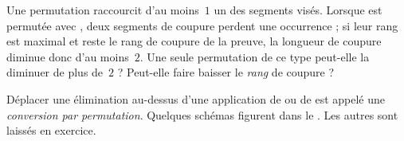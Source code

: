 \documentclass[../../../include/open-logic-section]{subfiles}
\begin{document}
\begin{prob}
Une permutation raccourcit d'au moins~$1$
un des segments visés. Lorsque \Elim{\land}
est permutée avec \Elim{\lor}, deux segments
de coupure perdent une occurrence ; si leur
rang est maximal et reste le rang de coupure
de la preuve, la longueur de coupure diminue
donc d'au moins~$2$. Une seule permutation
de ce type peut-elle la diminuer de plus
de~$2$ ? Peut-elle faire baisser le
\emph{rang} de coupure ?
\end{prob}

Déplacer une élimination au-dessus d'une
application de \Elim{\lor} ou de
\Elim{\lexists} est appelé une
\emph{conversion par permutation}.
Quelques schémas figurent dans le
.
Les autres sont laissés en exercice.

\end{document}
